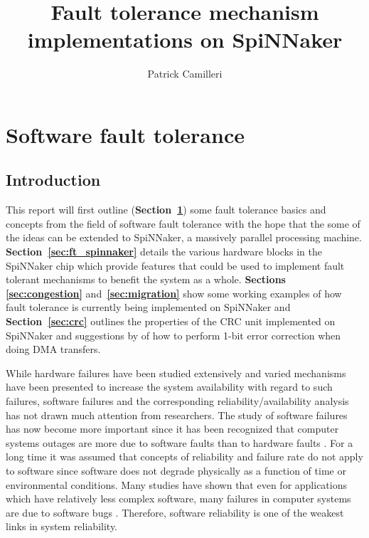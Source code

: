 \documentclass[a4paper, 11pt]{article}
\title{Fault tolerance mechanism implementations on SpiNNaker}
\author{Patrick Camilleri}
\date{}
\begin{document}
\maketitle

\tableofcontents

\newpage
\section{Software fault tolerance}
\label{sec:software_ft}

\subsection{Introduction}
This report will first outline (\textbf{Section~\ref{sec:software_ft}}) some fault tolerance basics and concepts from the field of software fault tolerance \citep{trivedi2008software} with the hope that the some of the ideas can be extended to SpiNNaker, a massively parallel processing machine. \textbf{Section~\ref{sec:ft_spinnaker}} details the various hardware blocks in the SpiNNaker chip which provide features that could be used to implement fault tolerant mechanisms to benefit the system as a whole. \textbf{Sections \ref{sec:congestion}} and~\textbf{\ref{sec:migration}} show some working examples of how fault tolerance is currently being implemented on SpiNNaker and \textbf{Section~\ref{sec:crc}} outlines the properties of the CRC unit implemented on SpiNNaker and suggestions by \citet{grymel2013error} of how to perform 1-bit error correction when doing DMA transfers.

While hardware failures have been studied extensively and varied mechanisms have been presented to increase the system availability with regard to such failures, software failures and the corresponding reliability/availability analysis has not drawn much attention from researchers. The study of software failures has now become more important since it has been recognized that computer systems outages are more due to software faults than to hardware faults \citep{gray1991high}. For a long time it was assumed that concepts of reliability and failure rate do not apply to software since software does not degrade physically as a function of time or environmental conditions. Many studies have shown that even for applications which have relatively less complex software, many failures in computer systems are due to software bugs \citep{pradhan1996fault}. Therefore, software reliability is one of the weakest links in system reliability.
\end{document}
